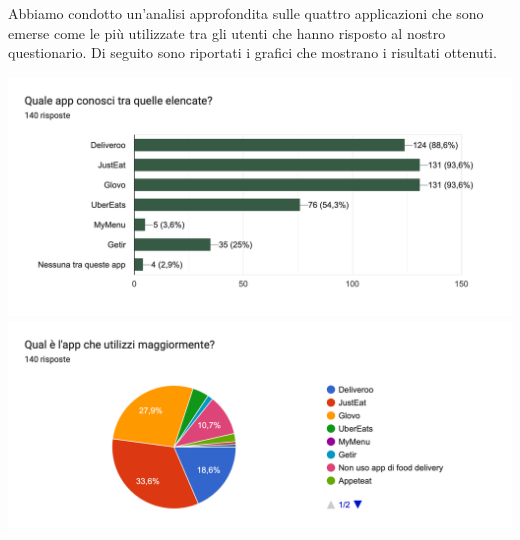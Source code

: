 \documentclass{article}
\begin{document}
\newpage
Abbiamo condotto un'analisi approfondita sulle quattro applicazioni che sono emerse come le più utilizzate tra gli utenti che hanno risposto al nostro questionario. Di seguito sono riportati i grafici che mostrano i risultati ottenuti.
\begin{center}
    \includegraphics[width=\textwidth]{Data/Grafici/App_competitor.png} 
    \includegraphics[width=\textwidth]{Data/Grafici/App_competitor_utilizzate.png}
\end{center}



\newpage
\end{document}
